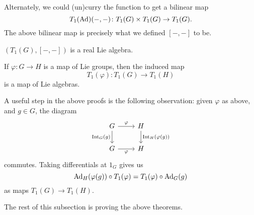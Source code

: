 \documentclass[12pt]{article}
\begin{document}
Alternately, we could (un)curry the function  to get a bilinear map
\begin{equation*} 
	T_{1}(\operatorname{Ad})(-, -) \colon T_{1}(G) \times T_{1}(G) \to T_{1}(G).
\end{equation*}
The above bilinear map is precisely what we defined $[-, -]$ to be.

\begin{thm}
	$(T_{1}(G), [-, -])$ is a real Lie algebra.
\end{thm}
\begin{thm}
	If $\varphi : G \to H$ is a map of Lie groups, then the induced map
	\begin{equation*} 
		T_{1}(\varphi) \colon T_{1}(G) \to T_{1}(H)
	\end{equation*}
	is a map of Lie algebras.
\end{thm}

A useful step in the above proofs is the following observation: 
given $\varphi$ as above, and $g \in G$, the diagram
\begin{equation*} 
	\begin{tikzcd}
		G \arrow[r, "\varphi"] \arrow[d, "\INT_{G}(g)"'] & H \arrow[d, "\INT_{H}(\varphi(g))"] \\
		G \arrow[r, "\varphi"'] & H
	\end{tikzcd}
\end{equation*}
commutes. Taking differentials at $1_{G}$ gives us
\begin{equation*} 
	\operatorname{Ad}_{H}(\varphi(g)) \circ T_{1}(\varphi) = T_{1}(\varphi) \circ \operatorname{Ad}_{G}(g)
\end{equation*}
as maps $T_{1}(G) \to T_{1}(H)$.

The rest of this subsection is proving the above theorems.
\end{document}
